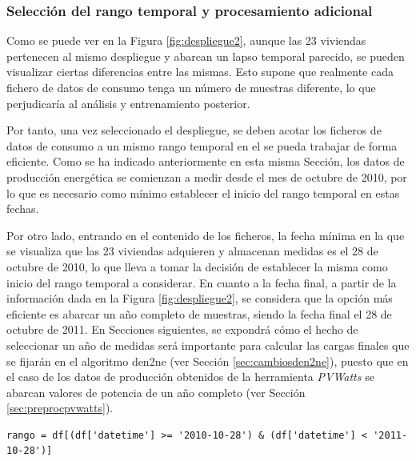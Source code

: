 




\subsubsection{Selección del rango temporal y procesamiento adicional}
\label{sec:rango}

Como se puede ver en la Figura \ref{fig:despliegue2}, aunque las 23 viviendas pertenecen al mismo despliegue y abarcan un lapso temporal parecido, se pueden visualizar ciertas diferencias entre las mismas. Esto supone que realmente cada fichero de datos de consumo tenga un número de muestras diferente, lo que perjudicaría al análisis y entrenamiento posterior. 

\vspace{3mm}

Por tanto, una vez seleccionado el despliegue, se deben acotar los ficheros de datos de consumo a un mismo rango temporal en el se pueda trabajar de forma eficiente. Como se ha indicado anteriormente en esta misma Sección, los datos de producción energética se comienzan a medir desde el mes de octubre de 2010, por lo que es necesario como mínimo establecer el inicio del rango temporal en estas fechas. 

\vspace{3mm}

Por otro lado, entrando en el contenido de los ficheros, la fecha mínima en la que se visualiza que las 23 viviendas adquieren y almacenan medidas es el 28 de octubre de 2010, lo que lleva a tomar la decisión de establecer la misma  como inicio del rango temporal a considerar. En cuanto a la fecha final, a partir de la información dada en la Figura \ref{fig:despliegue2}, se considera que la opción más eficiente es abarcar un año completo de muestras, siendo la fecha final el 28 de octubre de 2011. En Secciones siguientes, se expondrá cómo el hecho de seleccionar un año de medidas será importante para calcular las cargas finales que se fijarán en el algoritmo \gls{den2ne} (ver Sección \ref{sec:cambiosden2ne}), puesto que en el caso de los datos de producción obtenidos de la herramienta \textit{PVWatts} se abarcan valores de potencia de un año completo (ver Sección \ref{sec:preprocpvwatts}).

\vspace{3mm}

\begin{lstlisting}[style=Python, caption={Aplicación del rango temporal a los ficheros}]
rango = df[(df['datetime'] >= '2010-10-28') & (df['datetime'] < '2011-10-28')] 
\end{lstlisting}

